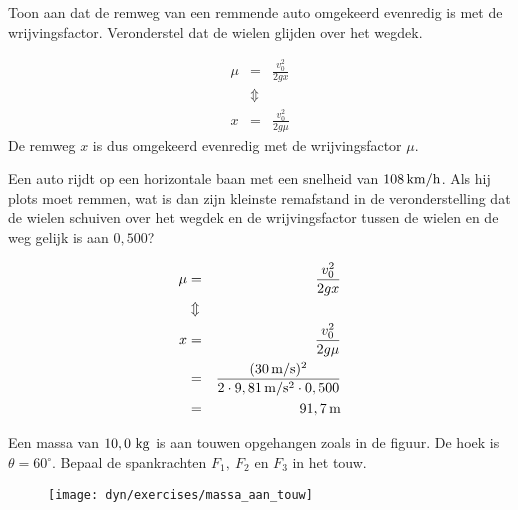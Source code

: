\documentclass{ximera}
\begin{document}
\begin{exercise} Toon aan dat de remweg van een remmende auto omgekeerd
evenredig is met de wrijvingsfactor. Veronderstel dat de wielen
glijden over het wegdek.
\begin{oplossing}
\begin{eqnarray*}
\mu&=&\frac{v_0^2}{2gx}\\
&\Updownarrow&\\
x&=&\frac{v_0^2}{2g\mu}
\end{eqnarray*}
De remweg $x$ is dus omgekeerd evenredig met de wrijvingsfactor $\mu$.
\end{oplossing}

\end{exercise}

\begin{exercise} Een auto rijdt op een horizontale baan met een snelheid van
$108\rm\,km/h$. Als hij plots moet remmen, wat is dan zijn kleinste
remafstand in de veronderstelling dat de wielen schuiven over het
wegdek en de wrijvingsfactor tussen de wielen en de weg gelijk is
aan $0,500$?
\begin{oplossing}
\begin{eqnarray*}
\mu&=&\frac{v_0^2}{2gx}\\
&\Updownarrow&\\
x&=&\frac{v_0^2}{2g\mu}\\
&=&\frac{(30\rm\,m/s)^2}{2\cdot9,81\rm\,m/s^2\cdot0,500}\\
&=&91,7\rm\,m
\end{eqnarray*}
\end{oplossing}


\end{exercise}

\begin{exercise} Een massa van $10,0~\rm kg$ is aan touwen opgehangen zoals in de figuur. De hoek is $\theta=60^\circ$. Bepaal de spankrachten $F_1,~F_2$ en $F_3$ in het touw.
\begin{figure}[h]
\begin{center}
\texttt{[image: dyn/exercises/massa\_aan\_touw]}
\end{center}
\end{figure}




\end{exercise}
\end{document}

